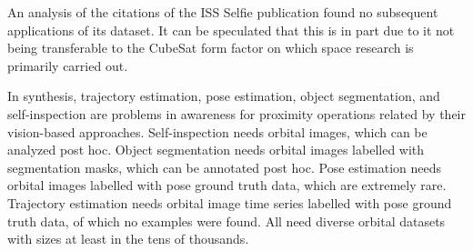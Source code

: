 \documentclass[11pt]{article}
\begin{document}
An analysis of the citations of the ISS Selfie publication found no subsequent applications of its dataset.
It can be speculated that this is in part due to it not being transferable to the CubeSat form factor on which space research is primarily carried out.

In synthesis, trajectory estimation, pose estimation, object segmentation, and self-inspection are problems in awareness for proximity operations related by their vision-based approaches.
Self-inspection needs orbital images, which can be analyzed post hoc.
Object segmentation needs orbital images labelled with segmentation masks, which can be annotated post hoc.
Pose estimation needs orbital images labelled with pose ground truth data, which are extremely rare.
Trajectory estimation needs orbital image time series labelled with pose ground truth data, of which no examples were found.
All need diverse orbital datasets with sizes at least in the tens of thousands.



\end{document}

